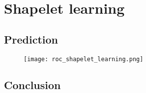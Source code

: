 \chapter{Shapelet learning}

\section{Prediction}

\begin{figure}
  \texttt{[image: roc\_shapelet\_learning.png]}
  \label{fig:roc-shapelet-learning}
\end{figure}

\section{Conclusion}
